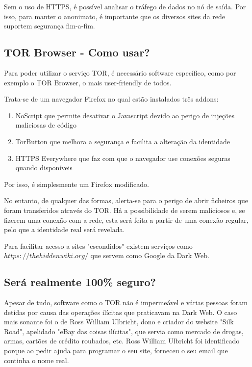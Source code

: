\documentclass{llncs}
\begin{document}
\par Sem o uso de HTTPS, é possível analisar o tráfego de dados no nó de saída. Por isso, para manter o anonimato, é importante que os diversos sites da rede suportem segurança fim-a-fim.

\subsection{TOR Browser - Como usar?}
\hspace{3mm} Para poder utilizar o serviço TOR, é necessário software específico, como por exemplo o TOR Browser, o mais user-friendly de todos.

Trata-se de um navegador Firefox no qual estão instalados três addons:
 
\begin{enumerate}
\item NoScript que permite desativar o Javascript devido ao perigo de injeções maliciosas de código
\item TorButton que melhora a segurança e facilita a alteração da identidade
\item HTTPS Everywhere que faz com que o navegador use conexões seguras quando disponíveis
\end{enumerate}

Por isso, é simplesmente um Firefox modificado.

\par No entanto, de qualquer das formas, alerta-se para o perigo de abrir ficheiros que foram transferidos através do TOR. Há a possibilidade de serem maliciosos e, se fizerem uma conexão com a rede, esta será feita a partir de uma conexão regular, pelo que a identidade real será revelada.

Para facilitar acesso a sites "escondidos" existem serviços como {$https://thehiddenwiki.org/$} que servem como Google da Dark Web.\cite{Hidden}

\subsection{Será realmente 100\% seguro?}
\hspace{3mm} Apesar de tudo, software como o TOR não é impermeável e várias pessoas foram detidas por causa das operações ilícitas que praticavam na Dark Web. O caso mais sonante foi o de Ross William Ulbricht, dono e criador do website "Silk Road", apelidado "eBay das coisas ilícitas", que servia como mercado de drogas, armas,  cartões de crédito roubados, etc. Ross William Ulbricht foi identificado porque ao pedir ajuda para programar o seu site, forneceu o seu email que continha o nome real. \cite{Ross}
\end{document}

